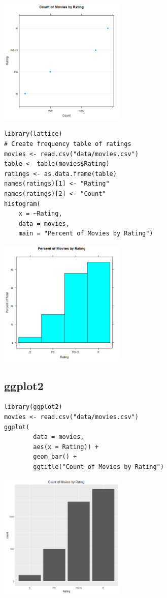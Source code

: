 \documentclass[a4paper, captions=tableheading]{tufte-book}
\begin{document}
\includegraphics[height=6cm]{img/1-cat-lattice-02.png}

\begin{verbatim}
library(lattice)
# Create frequency table of ratings
movies <- read.csv("data/movies.csv")
table <- table(movies$Rating)
ratings <- as.data.frame(table)
names(ratings)[1] <- "Rating"
names(ratings)[2] <- "Count"
histogram(
	x = ~Rating,
	data = movies,
	main = "Percent of Movies by Rating")
\end{verbatim}

\includegraphics[height=6cm]{img/1-cat-lattice-03.png}

\subsection{ggplot2}
\label{sec:orgheadline5}

\begin{verbatim}
library(ggplot2)
movies <- read.csv("data/movies.csv")
ggplot(
		data = movies,
		aes(x = Rating)) +
		geom_bar() +
		ggtitle("Count of Movies by Rating")
\end{verbatim}

\includegraphics[height=6cm]{img/1-cat-ggplot2-01.png}
\end{document}
